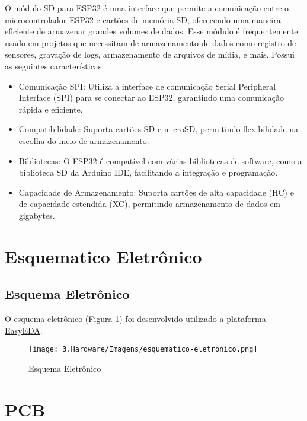 O módulo SD para ESP32 é uma interface que permite a comunicação entre o microcontrolador ESP32 e cartões de memória SD, oferecendo uma maneira eficiente de armazenar grandes volumes de dados. Esse módulo é frequentemente usado em projetos que necessitam de armazenamento de dados como registro de sensores, gravação de logs, armazenamento de arquivos de mídia, e mais. Possui as seguintes características:

\begin{itemize}
    \item Comunicação SPI: Utiliza a interface de comunicação Serial Peripheral Interface (SPI) para se conectar ao ESP32, garantindo uma comunicação rápida e eficiente.
    \item Compatibilidade: Suporta cartões SD e microSD, permitindo flexibilidade na escolha do meio de armazenamento.
    \item Bibliotecas: O ESP32 é compatível com várias bibliotecas de software, como a biblioteca SD da Arduino IDE, facilitando a integração e programação.
    \item Capacidade de Armazenamento: Suporta cartões de alta capacidade (HC) e de capacidade estendida (XC), permitindo armazenamento de dados em gigabytes.
\end{itemize}

\section{Esquematico Eletrônico}


\subsection{Esquema Eletrônico}

O esquema eletrônico (Figura \ref{figura:esquema_eletonico }) foi desenvolvido utilizado a plataforma \href{https://easyeda.com/}{EasyEDA}.

\begin{figure}[H]
\captionsetup{width=0.6\textwidth}%
\caption{ Esquema Eletrônico }%
\label{figura:esquema_eletonico }%
\texttt{[image: 3.Hardware/Imagens/esquematico-eletronico.png]}%
\end{figure}

\section{PCB}

